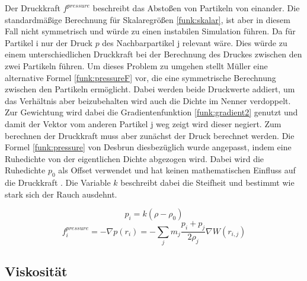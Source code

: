 \documentclass[intern,palatino]{cgBA}
\begin{document}
Der Druckkraft $f^{pressure}$ beschreibt das Abstoßen von Partikeln von einander. Die standardmäßige Berechnung für Skalaregrößen \ref{funk:skalar}, ist aber in diesem Fall nicht symmetrisch und würde zu einen instabilen Simulation führen. Da für Partikel i nur der Druck $p$ des Nachbarpartikel j relevant wäre. Dies würde zu einem unterschiedlichen Druckkraft bei der Berechnung des Druckes zwischen den zwei Partikeln führen. Um dieses Problem zu umgehen stellt Müller \cite{muller2003particle} eine alternative Formel \ref{funk:pressureF} vor, die eine symmetrische Berechnung zwischen den Partikeln ermöglicht. Dabei werden beide Druckwerte addiert, um das Verhältnis aber beizubehalten wird auch die Dichte im Nenner verdoppelt. Zur Gewichtung wird dabei die Gradientenfunktion \ref{funk:gradient2} genutzt und damit der Vektor vom anderen Partikel j weg zeigt wird dieser negiert.
\newline
Zum berechnen der Druckkraft muss aber zunächst der Druck berechnet werden. Die Formel \ref{funk:pressure} von Desbrun \cite{desbrun1996smoothed} diesbezüglich wurde angepasst, indem eine Ruhedichte von der eigentlichen Dichte abgezogen wird. Dabei wird die Ruhedichte $p_0$ als Offset verwendet und hat keinen mathematischen Einfluss auf die Druckkraft \cite{muller2003particle}. Die Variable $k$ beschreibt dabei die Steifheit und bestimmt wie stark sich der Rauch ausdehnt.

\begin{equation}\label{funk:pressure}
p_i = k(\rho - \rho_0)
\end{equation}
\begin{equation}\label{funk:pressureF}
f^{pressure}_i = - \nabla p(r_i) = - \sum_j m_j \frac{p_i+p_j}{2\rho_j} \nabla W(r_{i,j})
\end{equation}


\subsection{Viskosität}\label{visc}
\end{document}
